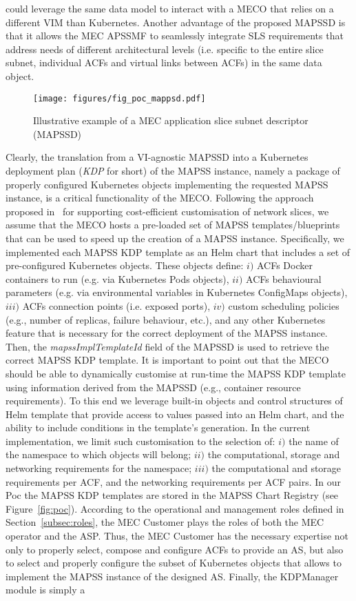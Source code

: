 could leverage the same data model to interact with a MECO that relies on a different VIM than Kubernetes. Another advantage of the proposed MAPSSD is that it allows the MEC APSSMF to seamlessly integrate SLS requirements that address needs of different architectural levels (i.e. specific to the entire slice subnet, individual ACFs and virtual links between ACFs) in the same data object. 
%
\begin{figure}[th]
    \centering
    \texttt{[image: figures/fig\_poc\_mappsd.pdf]}
   \caption{Illustrative example of a MEC application slice subnet descriptor (MAPSSD)}
    \label{fig:poc_massd_example}
\end{figure}
%

Clearly, the translation from a VI-agnostic MAPSSD into a Kubernetes deployment plan (\textit{KDP} for short) of the MAPSS instance, namely a package of properly configured Kubernetes objects implementing the requested MAPSS instance, is a critical functionality of the MECO. Following the approach proposed in~\cite{NGMN028} for supporting cost-efficient customisation of network slices, we assume that the MECO hosts a pre-loaded set of MAPSS templates/blueprints that can be used to speed up the creation of a MAPSS instance. Specifically, we implemented each MAPSS KDP template as an Helm chart that includes a set of pre-configured Kubernetes objects. These objects define: $i)$ ACFs Docker containers to run (e.g. via Kubernetes Pods objects), $ii)$ ACFs behavioural parameters (e.g. via environmental variables in Kubernetes ConfigMaps objects), $iii)$ ACFs connection points (i.e. exposed ports), $iv)$ custom scheduling policies (e.g., number of replicas, failure behaviour, etc.), and any other Kubernetes feature that is necessary for the correct deployment of the MAPSS instance. Then, the \textit{mapssImplTemplateId} field of the MAPSSD is used to retrieve the correct MAPSS KDP template. It is important to point out that the MECO should be able to dynamically customise at run-time the MAPSS KDP template using information derived from the MAPSSD (e.g., container resource requirements). To this end we leverage built-in objects and control structures of Helm template that provide access to values passed into an Helm chart, and the ability to include conditions in the template's generation. In the current implementation, we limit such customisation to the selection of: $i)$ the name of the namespace to which objects will belong; $ii)$ the computational, storage and networking requirements for the namespace; $iii)$ the computational and storage requirements per ACF, and the networking requirements per ACF pairs. In our Poc the MAPSS KDP templates are stored in the MAPSS Chart Registry (see Figure~\ref{fig:poc}). According to the operational and management roles defined in Section~\ref{subsec:roles}, the MEC Customer plays the roles of both the MEC operator and the ASP. Thus, the MEC Customer has the necessary expertise not only to properly select, compose and configure ACFs to provide an AS, but also to select and properly configure the subset of Kubernetes objects that allows to implement the MAPSS instance of the designed AS. Finally, the KDPManager module is simply a 